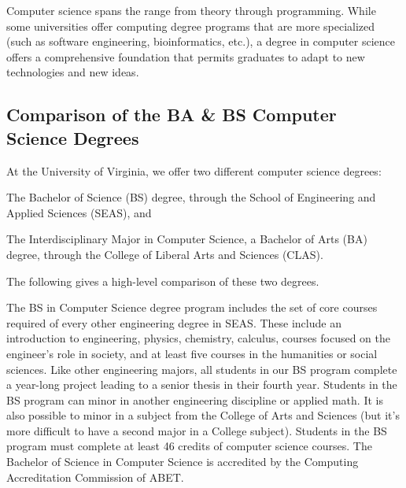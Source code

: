 Computer science spans the range from theory through
programming. While some universities offer computing degree programs
that are more specialized (such as software engineering,
bioinformatics, etc.), a degree in computer science offers a
comprehensive foundation that permits graduates to adapt to new
technologies and new ideas.

\subsection{Comparison of the BA \& BS Computer Science
  Degrees}

At the University of Virginia, we offer two different computer science
degrees:

\begin{itemlist}
\item The Bachelor of Science (BS) degree, through the School of
  Engineering and Applied Sciences (SEAS), and
\item The Interdisciplinary Major in Computer Science, a Bachelor of
  Arts (BA) degree, through the College of Liberal Arts and Sciences
  (CLAS).
\end{itemlist}

The following gives a high-level comparison of these two degrees.

The BS in Computer Science degree program includes the set of core
courses required of every other engineering degree in SEAS. These
include an introduction to engineering, physics, chemistry, calculus,
courses focused on the engineer's role in society, and at least five
courses in the humanities or social sciences. Like other engineering
majors, all students in our BS program complete a year-long project
leading to a senior thesis in their fourth year. Students in the BS
program can minor in another engineering discipline or applied
math. It is also possible to minor in a subject from the College of
Arts and Sciences (but it's more difficult to have a second major in a
College subject). Students in the BS program must complete at least 46
credits of computer science courses. The Bachelor of Science in
Computer Science is accredited by the Computing Accreditation
Commission of ABET.


